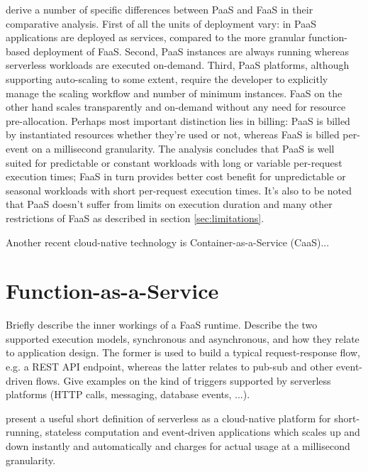 \documentclass[utf8,english]{gradu3}
\begin{document}
\textcite{albuquerque17faaspaas} derive a number of specific differences between PaaS and FaaS in their comparative analysis. First of all the units of deployment vary: in PaaS applications are deployed as services, compared to the more granular function-based deployment of FaaS. Second, PaaS instances are always running whereas serverless workloads are executed on-demand. Third, PaaS platforms, although supporting auto-scaling to some extent, require the developer to explicitly manage the scaling workflow and number of minimum instances. FaaS on the other hand scales transparently and on-demand without any need for resource pre-allocation. Perhaps most important distinction lies in billing: PaaS is billed by instantiated resources whether they're used or not, whereas FaaS is billed per-event on a millisecond granularity. The analysis concludes that PaaS is well suited for predictable or constant workloads with long or variable per-request execution times; FaaS in turn provides better cost benefit for unpredictable or seasonal workloads with short per-request execution times. It's also to be noted that PaaS doesn't suffer from limits on execution duration and many other restrictions of FaaS as described in section \ref{sec:limitations}.

Another recent cloud-native technology is Container-as-a-Service (CaaS)...

\section{Function-as-a-Service} \label{sec:faas}

Briefly describe the inner workings of a FaaS runtime. Describe the two supported execution models, synchronous and asynchronous, and how they relate to application design. The former is used to build a typical request-response flow, e.g. a REST API endpoint, whereas the latter relates to pub-sub and other event-driven flows. Give examples on the kind of triggers supported by serverless platforms (HTTP calls, messaging, database events, ...).

\textcite{fox17} present a useful short definition of serverless as a cloud-native platform for short-running, stateless computation and event-driven applications which scales up and down instantly and automatically and charges for actual usage at a millisecond granularity.
\end{document}
